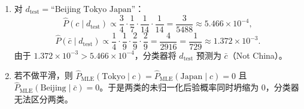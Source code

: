 \begin{exercise}[title={多项式朴素贝叶斯参数估计与分类手算},level=standard,points=15,tags={朴素贝叶斯,最大后验,手算}]
\begin{solution}
\begin{enumerate}
\[  \]
  \[
    \hat{P}(\text{Tokyo}\mid c)=\hat{P}(\text{Japan}\mid c)=\frac{0+1}{14}=\frac{1}{14}.
  \]
  类别 $\bar{c}$ 总词次 $T_{\bar{c}}=3$，分母 $T_{\bar{c}}+|V|=9$：
  \[
    \hat{P}(\text{Chinese}\mid \bar{c})=\hat{P}(\text{Tokyo}\mid \bar{c})=\hat{P}(\text{Japan}\mid \bar{c})=\frac{1+1}{9}=\frac{2}{9},
  \]
  \[
    \hat{P}(\text{Beijing}\mid \bar{c})=\hat{P}(\text{Shanghai}\mid \bar{c})=\hat{P}(\text{Macao}\mid \bar{c})=\frac{0+1}{9}=\frac{1}{9}.
  \]
  \item 对 $d_{\mathrm{test}}=\text{``Beijing Tokyo Japan''}$：
  \[
    \hat{P}(c\mid d_{\mathrm{test}}) \propto \frac{3}{4}\cdot\frac{1}{7}\cdot\frac{1}{14}\cdot\frac{1}{14}
    = \frac{3}{5488} \approx 5.466\times 10^{-4},
  \]
  \[
    \hat{P}(\bar{c}\mid d_{\mathrm{test}}) \propto \frac{1}{4}\cdot\frac{1}{9}\cdot\frac{2}{9}\cdot\frac{2}{9}
    = \frac{4}{2916} = \frac{1}{729} \approx 1.372\times 10^{-3}.
  \]
  由于 $1.372\times 10^{-3} > 5.466\times 10^{-4}$，分类器将 $d_{\mathrm{test}}$ 预测为 $\bar{c}$（Not China）。
  \item 若不做平滑，则 $\hat{P}_{\mathrm{MLE}}(\text{Tokyo}\mid c)=\hat{P}_{\mathrm{MLE}}(\text{Japan}\mid c)=0$ 且 $\hat{P}_{\mathrm{MLE}}(\text{Beijing}\mid \bar{c})=0$。于是两类的未归一化后验概率同时坍缩为 $0$，分类器无法区分两类。
\end{enumerate}
\end{solution}
\end{exercise}


